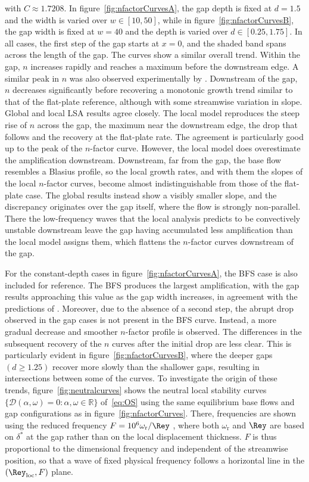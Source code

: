 \documentclass[lineno]{jfm}
\newcommand\dstar{{\delta^*}} %
\begin{document}
with $C\approx1.7208$. In figure~\ref{fig:nfactorCurvesA}, the gap depth is fixed at $d=1.5$ and the width is varied over $w\in[10,50]$, while in figure~\ref{fig:nfactorCurvesB}, the gap width is fixed at $w=40$ and the depth is varied over $d\in[0.25,1.75]$. In all cases, the first step of the gap starts at $x=0$, and the shaded band spans across the length of the gap. The curves show a similar overall trend. Within the gap, $n$ increases rapidly and reaches a maximum before the downstream edge. A similar peak in $n$ was also observed experimentally by \citet{jeffGaps}. Downstream of the gap, $n$ decreases significantly before recovering a monotonic growth trend similar to that of the flat-plate reference, although with some streamwise variation in slope. Global and local \ac{LSA} results agree closely. The local model reproduces the steep rise of $n$ across the gap, the maximum near the downstream edge, the drop that follows and the recovery at the flat-plate rate. The agreement is particularly good up to the peak of the $n$-factor curve. However, the local model does overestimate the amplification downstream. Downstream, far from the gap, the base flow resembles a Blasius profile, so the local growth rates, and with them the slopes of the local $n$-factor curves, become almost indistinguishable from those of the flat-plate case. The global results instead show a visibly smaller slope, and the discrepancy originates over the gap itself, where the flow is strongly non-parallel. There the low-frequency waves that the local analysis predicts to be convectively unstable downstream leave the gap having accumulated less amplification than the local model assigns them, which flattens the $n$-factor curves downstream of the gap.

For the constant-depth cases in figure~\ref{fig:nfactorCurvesA}, the \ac{BFS} case is also included for reference. The \ac{BFS} produces the largest amplification, with the gap results approaching this value as the gap width increases, in agreement with the predictions of \citet{jeffGaps}. Moreover, due to the absence of a second step, the abrupt drop observed in the gap cases is not present in the \ac{BFS} curve. Instead, a more gradual decrease and smoother $n$-factor profile is observed. The differences in the subsequent recovery of the $n$ curves after the initial drop are less clear. This is particularly evident in figure~\ref{fig:nfactorCurvesB}, where the deeper gaps $(d\geq1.25)$ recover more slowly than the shallower gaps, resulting in intersections between some of the curves. To investigate the origin of these trends, figure~\ref{fig:neutralcurves} shows the neutral local stability curves $\{\mathcal{D}(\alpha,\omega)=0:\alpha,\omega\in\mathbb{R}\}$ of~\eqref{eq:OS} using the same equilibrium base flows and gap configurations as in figure~\ref{fig:nfactorCurves}. There, frequencies are shown using the reduced frequency $F=10^6\omega_\mathrm{r}/\Rey$ \citep{schmid2001stability}, where both $\omega_\mathrm{r}$ and $\Rey$ are based on $\dstar$ at the gap rather than on the local displacement thickness. $F$ is thus proportional to the dimensional frequency and independent of the streamwise position, so that a wave of fixed physical frequency follows a horizontal line in the $(\Rey_\mathrm{loc},F)$ plane.
\end{document}

